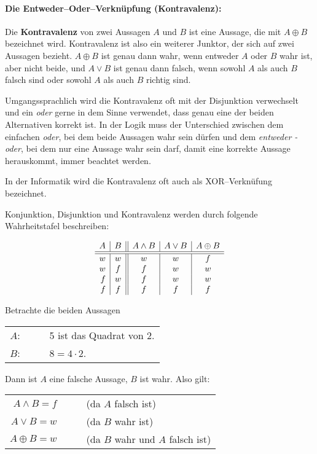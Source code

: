 \paragraph{Die Entweder--Oder--Verknüpfung (Kontravalenz): \newline } 
Die \textbf{Kontravalenz} von zwei Aussagen $A$ und $B$ ist eine Aussage, die  mit $A \oplus B$ bezeichnet 
wird. Kontravalenz ist also ein weiterer Junktor, der sich auf zwei Aussagen bezieht. $A \oplus B$ ist genau dann wahr, 
wenn entweder $A$ oder $B$ wahr ist, aber nicht beide, und $A \vee B$ ist genau dann falsch, wenn sowohl $A$ 
als auch $B$ falsch sind oder sowohl $A$ als auch $B$ richtig sind. 

Umgangssprachlich wird die Kontravalenz oft mit der Disjunktion verwechselt und ein \textit{oder} gerne in dem Sinne 
verwendet, dass genau eine der beiden Alternativen korrekt ist. In der Logik muss der Unterschied zwischen dem einfachen 
\textit{oder}, bei dem beide Aussagen wahr sein dürfen und dem \textit{entweder - oder}, bei dem nur eine Aussage 
wahr sein darf, damit eine korrekte Aussage herauskommt, immer beachtet werden. 

In der Informatik wird die Kontravalenz oft auch als XOR--Verknüfung bezeichnet.  

Konjunktion, Disjunktion und Kontravalenz werden durch folgende Wahrheitstafel beschreiben:

	$$ \begin{array}{ r | c || c | c | c }
	A & B & A \wedge B & A \vee B & A \oplus B\\
	\hline \hline
	w & w &  w & w & f\\
	w & f &  f & w & w \\
	f & w &  f & w & w \\
	f & f &  f & f & f
	\end{array}$$

\begin{beispiel}\label{bsp3aussagen} Betrachte die beiden Aussagen

\begin{tabular}{r c l}
$A$: & $\quad$ & 5 ist das Quadrat von 2. \\
$B$: & $\quad$ & $ 8 = 4 \cdot 2$.
\end{tabular}

Dann ist $A$ eine falsche Aussage, $B$ ist wahr. Also gilt:

\begin{tabular}{r c l}
$A \wedge B = f$ & $\quad$ & (da $A$ falsch ist) \\
$A \vee B = w$ & $\quad$ & (da $B$ wahr ist) \\
$A \oplus B = w$ & $\quad$ & (da $B$ wahr und $A$ falsch ist) \\
\end{tabular}

\end{beispiel}

